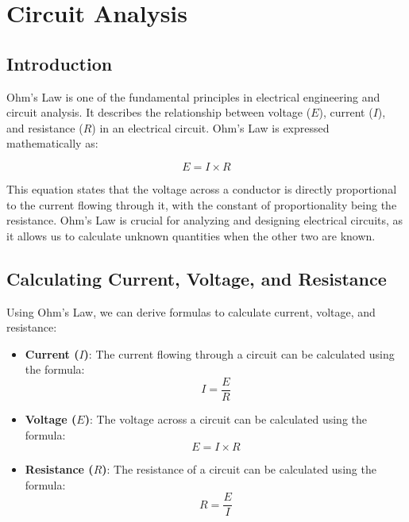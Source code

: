 \section{Circuit Analysis}
\label{section:circuit_analysis}

\subsection*{Introduction}
Ohm's Law is one of the fundamental principles in electrical engineering and circuit analysis. It describes the relationship between voltage (\(E\)), current (\(I\)), and resistance (\(R\)) in an electrical circuit. Ohm's Law is expressed mathematically as:

\begin{equation}
    E = I \times R
    \label{eq:ohms_law}
\end{equation}

This equation states that the voltage across a conductor is directly proportional to the current flowing through it, with the constant of proportionality being the resistance. Ohm's Law is crucial for analyzing and designing electrical circuits, as it allows us to calculate unknown quantities when the other two are known.

\subsection*{Calculating Current, Voltage, and Resistance}
Using Ohm's Law, we can derive formulas to calculate current, voltage, and resistance:

\begin{itemize}
    \item \textbf{Current (\(I\))}: The current flowing through a circuit can be calculated using the formula:
    \begin{equation}
        I = \frac{E}{R}
        \label{eq:current}
    \end{equation}
    
    \item \textbf{Voltage (\(E\))}: The voltage across a circuit can be calculated using the formula:
    \begin{equation}
        E = I \times R
        \label{eq:voltage}
    \end{equation}
    
    \item \textbf{Resistance (\(R\))}: The resistance of a circuit can be calculated using the formula:
    \begin{equation}
        R = \frac{E}{I}
        \label{eq:resistance}
    \end{equation}
\end{itemize}

